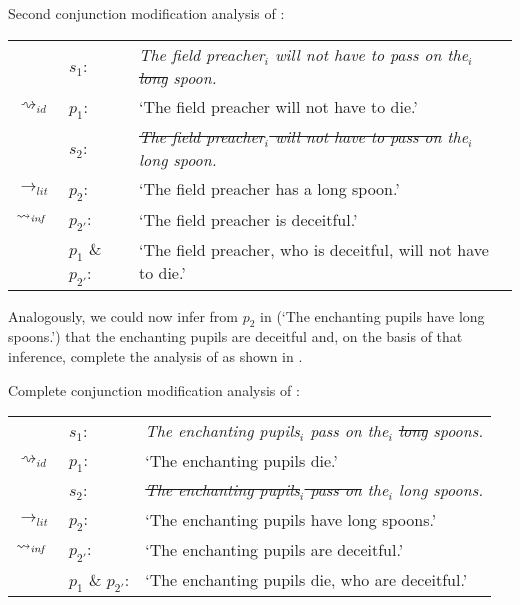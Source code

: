 \documentclass[output=paper]{langsci/langscibook}
\begin{document}
\ea \label{analysis quoted long spoon} 
Second conjunction modification analysis of :\smallskip\\
\begin{tabularx}{\linewidth}[t]{@{}llQ@{}}
    & 	$s_{1}$: & \textit{The field preacher$_{i}$ will not have to pass on the$_{i}$ \sout{long} spoon.} \\
$\rightsquigarrow_{id}$	&	$p_{1}$: & `The field preacher will not have to die.'\medskip\\
    & 	$s_{2}$: & \textit{\sout{The field preacher$_{i}$ will not have to pass on} the$_{i}$ long spoon.} \\
$\rightarrow_{lit}$	&	$p_{2}$: & `The field preacher has a long spoon.' \\
$\rightsquigarrow_{\text{\itshape inf}}$	&	$p_{2'}$: & `The field preacher is deceitful.' \medskip\\
                    &	$p_{1}$ \& $p_{2'}$: & `The field preacher, who is deceitful, will not have to die.' \\
\end{tabularx}
\z

\noindent Analogously, we could now infer from $p_{2}$ in  (`The enchanting pupils have long spoons.') that the enchanting pupils are deceitful and, on the basis of that inference, complete the analysis of  as shown in .

\ea \label{analysis long spoons -- complete} 
Complete conjunction modification analysis of :\smallskip\\
\begin{tabularx}{\linewidth}{@{}llQ@{}}
    & 	$s_{1}$: & \textit{The enchanting pupils$_{i}$ pass on the$_{i}$ \sout{long} spoons.} \\
$\rightsquigarrow_{id}$	&	$p_{1}$: & `The enchanting pupils die.'\medskip\\
            & 	$s_{2}$: & \textit{\sout{The enchanting pupils$_{i}$ pass on} the$_{i}$ long spoons.} \\
$\rightarrow_{lit}$	 &	$p_{2}$: & `The enchanting pupils have long spoons.' \\
$\rightsquigarrow_{\text{\itshape inf}}$	&	$p_{2'}$: & `The enchanting pupils are deceitful.'\medskip\\
                            &	$p_{1}$ \& $p_{2'}$: & `The enchanting pupils die, who are deceitful.' \\
\end{tabularx}
\z
\end{document}

